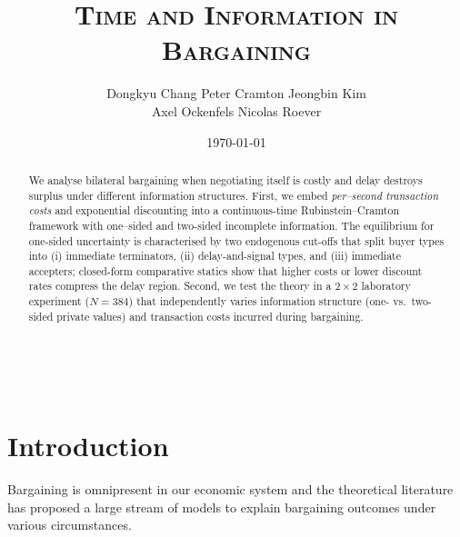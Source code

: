 



\title{\textsc{Time and Information in Bargaining}}
\author{Dongkyu Chang \;\; Peter Cramton \;\; Jeongbin Kim \\ \;\;Axel Ockenfels \;\; Nicolas Roever }





\date{\today}




\maketitle
\setcounter{page}{0}
\thispagestyle{empty}

\begin{abstract}
\noindent We analyse bilateral bargaining when negotiating itself is costly and delay destroys surplus under different information structures.  
First, we embed \emph{per--second transaction costs} and exponential discounting into a continuous-time Rubinstein–Cramton framework with one–sided and two-sided incomplete information.  The equilibrium for one-sided uncertainty is characterised by two endogenous cut-offs that split buyer types into (i) immediate terminators, (ii) delay-and-signal types, and (iii) immediate accepters; closed-form comparative statics show that higher costs or lower discount rates compress the delay region.  
Second, we test the theory in a \(2\times2\) laboratory experiment (\(N=384\)) that independently varies information structure (one- vs.\ two-sided private values) and transaction costs incurred during bargaining. 


\end{abstract}

\bigskip

\\
\vspace{0.5em}
\vspace*{5cm}

\pagebreak


\section{Introduction}
Bargaining is omnipresent in our economic system and the theoretical literature has proposed a large stream of models to explain bargaining outcomes under various circumstances. 


